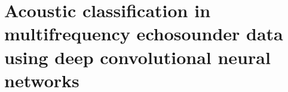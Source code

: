    
\section{Acoustic classification in multifrequency echosounder data using deep convolutional neural networks} \label{unet_paper_acoustic}
    
    
    
    
    
    
    
    
    
    
